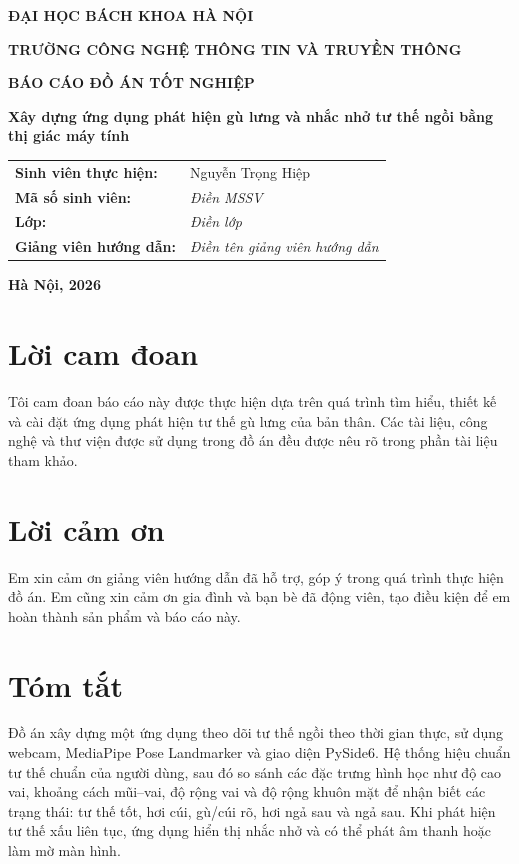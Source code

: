 \documentclass[12pt,a4paper,oneside]{report}
\newcommand{\studentname}{Nguyễn Trọng Hiệp}
\newcommand{\studentid}{\textit{Điền MSSV}}
\newcommand{\classname}{\textit{Điền lớp}}
\newcommand{\supervisor}{\textit{Điền tên giảng viên hướng dẫn}}
\newcommand{\thesistitle}{Xây dựng ứng dụng phát hiện gù lưng và nhắc nhở tư thế ngồi bằng thị giác máy tính}
\begin{document}
\begin{titlepage}
    \centering
    {\bfseries ĐẠI HỌC BÁCH KHOA HÀ NỘI\par}
    {\bfseries TRƯỜNG CÔNG NGHỆ THÔNG TIN VÀ TRUYỀN THÔNG\par}
    \vspace{2.5cm}

    {\bfseries\Large BÁO CÁO ĐỒ ÁN TỐT NGHIỆP\par}
    \vspace{1.2cm}
    {\bfseries\Large \thesistitle\par}
    \vspace{2.2cm}

    \begin{tabular}{>{\bfseries}p{5cm}p{8cm}}
        Sinh viên thực hiện: & \studentname \\
        Mã số sinh viên: & \studentid \\
        Lớp: & \classname \\
        Giảng viên hướng dẫn: & \supervisor \\
    \end{tabular}

    \vfill
    {\bfseries Hà Nội, 2026\par}
\end{titlepage}

\chapter*{Lời cam đoan}
Tôi cam đoan báo cáo này được thực hiện dựa trên quá trình tìm hiểu, thiết kế và cài đặt ứng dụng phát hiện tư thế gù lưng của bản thân. Các tài liệu, công nghệ và thư viện được sử dụng trong đồ án đều được nêu rõ trong phần tài liệu tham khảo.

\chapter*{Lời cảm ơn}
Em xin cảm ơn giảng viên hướng dẫn đã hỗ trợ, góp ý trong quá trình thực hiện đồ án. Em cũng xin cảm ơn gia đình và bạn bè đã động viên, tạo điều kiện để em hoàn thành sản phẩm và báo cáo này.

\chapter*{Tóm tắt}
Đồ án xây dựng một ứng dụng theo dõi tư thế ngồi theo thời gian thực, sử dụng webcam, MediaPipe Pose Landmarker và giao diện PySide6. Hệ thống hiệu chuẩn tư thế chuẩn của người dùng, sau đó so sánh các đặc trưng hình học như độ cao vai, khoảng cách mũi--vai, độ rộng vai và độ rộng khuôn mặt để nhận biết các trạng thái: tư thế tốt, hơi cúi, gù/cúi rõ, hơi ngả sau và ngả sau. Khi phát hiện tư thế xấu liên tục, ứng dụng hiển thị nhắc nhở và có thể phát âm thanh hoặc làm mờ màn hình.
\end{document}
